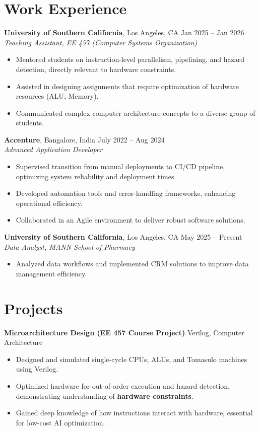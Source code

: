 \documentclass[letterpaper,10pt]{article}
\begin{document}
\section*{Work Experience}
\textbf{University of Southern California}, Los Angeles, CA \hfill Jan 2025 -- Jan 2026 \\
\textit{Teaching Assistant, EE 457 (Computer Systems Organization)}
\begin{itemize}
    \item Mentored students on instruction-level parallelism, pipelining, and hazard detection, directly relevant to hardware constraints.
    \item Assisted in designing assignments that require optimization of hardware resources (ALU, Memory).
    \item Communicated complex computer architecture concepts to a diverse group of students.
\end{itemize}

\textbf{Accenture}, Bangalore, India \hfill July 2022 -- Aug 2024 \\
\textit{Advanced Application Developer}
\begin{itemize}
    \item Supervised transition from manual deployments to CI/CD pipeline, optimizing system reliability and deployment times.
    \item Developed automation tools and error-handling frameworks, enhancing operational efficiency.
    \item Collaborated in an Agile environment to deliver robust software solutions.
\end{itemize}

\textbf{University of Southern California}, Los Angeles, CA \hfill May 2025 -- Present \\
\textit{Data Analyst, MANN School of Pharmacy}
\begin{itemize}
    \item Analyzed data workflows and implemented CRM solutions to improve data management efficiency.
\end{itemize}

\section*{Projects}
\textbf{Microarchitecture Design (EE 457 Course Project)} \hfill Verilog, Computer Architecture \\
\begin{itemize}
    \item Designed and simulated single-cycle CPUs, ALUs, and Tomasulo machines using Verilog.
    \item Optimized hardware for out-of-order execution and hazard detection, demonstrating understanding of \textbf{hardware constraints}.
    \item Gained deep knowledge of how instructions interact with hardware, essential for low-cost AI optimization.
\end{itemize}
\end{document}
